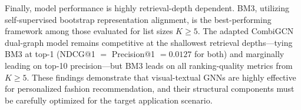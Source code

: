 Finally, model performance is highly retrieval-depth dependent. BM3, utilizing self-supervised bootstrap representation alignment, is the best-performing framework among those evaluated for list sizes $K \ge 5$. The adapted CombiGCN dual-graph model remains competitive at the shallowest retrieval depths---tying BM3 at top-1 (NDCG@1 $=$ Precision@1 $= 0.0127$ for both) and marginally leading on top-10 precision---but BM3 leads on all ranking-quality metrics from $K \ge 5$. These findings demonstrate that visual-textual GNNs are highly effective for personalized fashion recommendation, and their structural components must be carefully optimized for the target application scenario.
